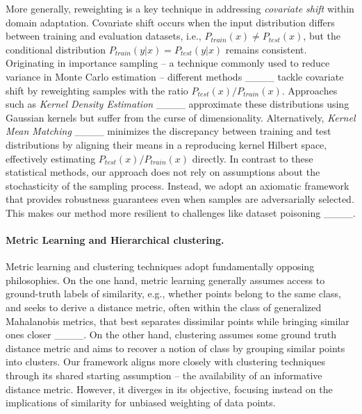 More generally, reweighting is a key technique in addressing \emph{covariate shift} within domain adaptation. Covariate shift occurs when the input distribution differs between training and evaluation datasets, i.e., $P_{train}(x) \neq P_{test}(x)$, but the conditional distribution $P_{train}(y \vert x) = P_{test}(y \vert x)$ remains consistent. Originating in importance sampling -- a technique commonly used to reduce variance in Monte Carlo estimation -- different methods ____ tackle covariate shift by reweighting samples with the ratio $P_{test} (x) / P_{train}(x).$ Approaches such as \emph{Kernel Density Estimation} ____ approximate these distributions using Gaussian kernels but suffer from the curse of dimensionality. Alternatively, \emph{Kernel Mean Matching} ____ minimizes the discrepancy between training and test distributions by aligning their means in a reproducing kernel Hilbert space, effectively estimating $P_{test} (x) / P_{train}(x) $ directly.
In contrast to these statistical methods, our approach does not rely on assumptions about the stochasticity of the sampling process. Instead, we adopt an axiomatic framework that provides robustness guarantees even when samples are adversarially selected. This makes our method more resilient to challenges like dataset poisoning ____.







\paragraph{Metric Learning and Hierarchical clustering.}

Metric learning and clustering techniques adopt fundamentally opposing philosophies. On the one hand, metric learning generally assumes access to ground-truth labels of similarity, e.g., whether points belong to the same class, and seeks to derive a distance metric, often within the class of generalized Mahalanobis metrics, that best separates dissimilar points while bringing similar ones closer ____. 
On the other hand, clustering assumes some ground truth distance metric and aims to recover a notion of class by grouping similar points into clusters.
Our framework aligns more closely with clustering techniques through its shared starting assumption -- the availability of an informative distance metric. However, it diverges in its objective, focusing instead on the implications of similarity for 
unbiased weighting of 
data points.


